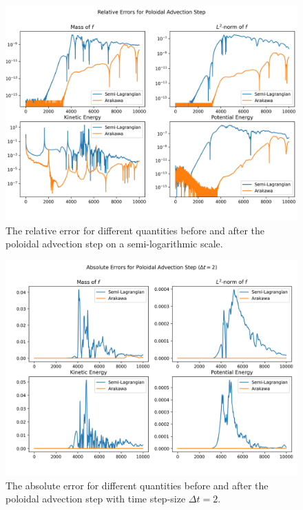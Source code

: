 \begin{figure}
	\centering
	\includegraphics[width=0.9\linewidth]{plots/rel_err_log}
	\caption{The relative error for different quantities before and after the poloidal advection step on a semi-logarithmic scale.}
	\label{fig:relerrlog}
\end{figure}


\begin{figure}
	\centering
	\includegraphics[width=0.9\linewidth]{plots/abs_err dt2}
	\caption{The absolute error for different quantities before and after the poloidal advection step with time step-size $\Delta t = 2$.}
	\label{fig:abserr_dt2}
\end{figure}


